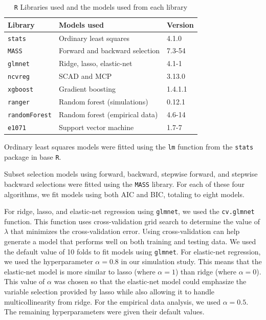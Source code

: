 \documentclass{article}
\begin{document}
\begin{table}[h]
	\centering
	\caption{\lstinline!R! Libraries used and the models used from each library}
	\label{tab:model-libraries}
	\begin{tabular}{lll}\hline
		\textbf{Library}    	  & \textbf{Models used}                                 & \textbf{Version} \\ \hline
		\lstinline!stats! \cite{r}   	  & Ordinary least squares                               & 4.1.0            \\
		\lstinline!MASS! \cite{venables2002mass}   	  & Forward and backward selection                       & 7.3-54           \\
		\lstinline!glmnet! \cite{friedman2010regularization} 	  & Ridge, lasso, elastic-net                            & 4.1-1            \\
		\lstinline!ncvreg! \cite{breheny2011ncvreg}	      & SCAD and MCP                                         & 3.13.0           \\
		\lstinline!xgboost! \cite{chen2021xgboost}	  & Gradient boosting                                    & 1.4.1.1          \\
		\lstinline!ranger! \cite{wright2017ranger} 	  & Random forest (simulations)                          & 0.12.1           \\
		\lstinline!randomForest! \cite{liaw2002rf} & Random forest (empirical data)                       & 4.6-14           \\
		\lstinline!e1071! \cite{meyer2021e1071}  	  & Support vector machine                               & 1.7-7            \\\hline
	\end{tabular}
\end{table}

Ordinary least squares models were fitted using the \lstinline!lm! function from the \lstinline!stats! package in base \lstinline!R!.

Subset selection models using forward, backward, stepwise forward, and stepwise backward selections were fitted using the \lstinline!MASS! library. For each of these four algorithms, we fit models using both AIC and BIC, totaling to eight models.

For ridge, lasso, and elastic-net regression using \lstinline!glmnet!, we used the \lstinline!cv.glmnet! function. This function uses cross-validation grid search to determine the value of $\lambda$ that minimizes the cross-validation error. Using cross-validation can help generate a model that performs well on both training and testing data. We used the default value of 10 folds to fit models using \lstinline!glmnet!. For elastic-net regression, we used the hyperparameter $\alpha = 0.8$ in our simulation study. This means that the elastic-net model is more similar to lasso (where $\alpha = 1$) than ridge (where $\alpha = 0$). This value of $\alpha$ was chosen so that the elastic-net model could emphasize the variable selection provided by lasso while also allowing it to handle multicollinearity from ridge. For the empirical data analysis, we used $\alpha = 0.5$. The remaining hyperparameters were given their default values.
\end{document}
